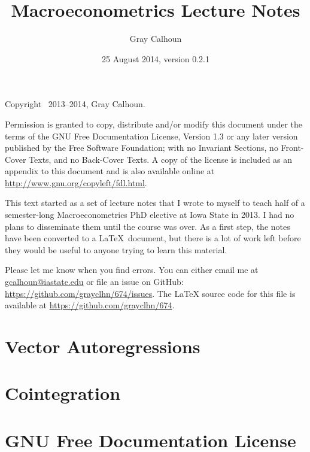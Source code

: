 \documentclass[12pt,notitlepage]{report}
\title{Macroeconometrics Lecture Notes}
\author{Gray Calhoun}
\date{25 August 2014, version 0.2.1}
\begin{document}
\maketitle

\bigskip\noindent%
Copyright \textcopyright\ 2013--2014, Gray Calhoun.

Permission is granted to copy, distribute and/or modify this document
under the terms of the GNU Free Documentation License, Version 1.3 or
any later version published by the Free Software Foundation; with no
Invariant Sections, no Front-Cover Texts, and no Back-Cover Texts.  A
copy of the license is included as an appendix to this document and is
also available online at \url{http://www.gnu.org/copyleft/fdl.html}.

This text started as a set of lecture notes that I
wrote to myself to teach half of a semester-long Macroeconometrics PhD
elective at Iowa State in 2013.  I had no plans to disseminate them
until the course was over.  As a first step, the notes have been
converted to a \LaTeX\ document, but there is a lot of work left
before they would be useful to anyone trying to learn this material.

Please let me know when you find errors. You can either email me at
\url{gcalhoun@iastate.edu} or file an issue on GitHub:
\url{https://github.com/grayclhn/674/issues}. The LaTeX source code
for this file is available at \url{https://github.com/grayclhn/674}.

\tableofcontents
{}
\newpage

\chapter{Vector Autoregressions}





\chapter{Cointegration}




\chapter*{GNU Free Documentation License}



\end{document}
